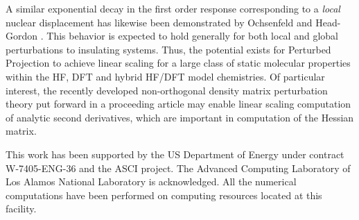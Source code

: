 \documentclass[prl,twocolumn,showpacs,twocolumngrid,superbib]{revtex4}
\begin{document}
A similar exponential decay in the first order response corresponding to a {\em local} nuclear 
displacement has likewise been demonstrated by Ochsenfeld and Head-Gordon \cite{Ochsenfeld97}. 
This behavior is expected to hold generally for both local and global perturbations to 
insulating systems.  Thus, the potential exists for Perturbed Projection to achieve linear scaling
for a large class of static molecular properties within the HF, DFT and hybrid HF/DFT model 
chemistries. Of particular interest, the recently developed non-orthogonal density matrix perturbation 
theory put forward in a proceeding article \cite{ANiklasson05a} may enable 
linear scaling computation of analytic second derivatives, which are important 
in computation of the Hessian matrix.  

\begin{acknowledgments}
 This work has been supported by the US Department of Energy 
 under contract W-7405-ENG-36 and the ASCI project.  
 The Advanced Computing Laboratory of Los 
 Alamos National Laboratory is acknowledged.
 All the numerical computations have been
 performed on computing resources located at this facility.
\end{acknowledgments}

%

\end{document}
